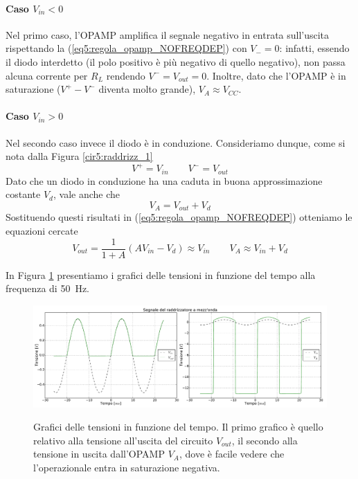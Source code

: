 \paragraph*{Caso $V_{in}<0$}

Nel primo caso, l'OPAMP amplifica il segnale negativo in entrata sull'uscita rispettando la (\ref{eq5:regola_opamp_NOFREQDEP}) con $V_-=0$: infatti, essendo il diodo interdetto (il polo positivo è più negativo di quello negativo), non passa alcuna corrente per $R_L$ rendendo $V^-=V_{out}=0$. Inoltre, dato che l'OPAMP è in saturazione ($V^+-V^-$ diventa molto grande), $V_A \approx V_{CC}$.

\paragraph*{Caso $V_{in}>0$}

Nel secondo caso invece il diodo è in conduzione. Consideriamo dunque, come si nota dalla Figura \ref{cir5:raddrizz_1}
$$V^+=V_{in} \qquad V^-=V_{out}$$
Dato che un diodo in conduzione ha una caduta in buona approssimazione costante $V_d$, vale anche che
$$V_{A}=V_{out}+V_d$$
Sostituendo questi risultati in (\ref{eq5:regola_opamp_NOFREQDEP}) otteniamo le equazioni cercate
\begin{equation}
V_{out}=\frac{1}{1+A} (A V_{in} - V_d) \approx V_{in} \qquad V_{A} \approx V_{in}+V_d
\label{eq5:leggi_1.1}
\end{equation}

In Figura \ref{gr5:primo_raddrizzatore} presentiamo i grafici delle tensioni in funzione del tempo alla frequenza di \SI{50}{\Hz}.

\begin{figure}[H]
 \centering
   {\includegraphics[width=\textwidth]{../E05/latex/unite_tempo.pdf}}
 \caption{Grafici delle tensioni in funzione del tempo. Il primo grafico è quello relativo alla tensione all'uscita del circuito $V_{out}$, il secondo alla tensione in uscita dall'OPAMP $V_A$, dove è facile vedere che l'operazionale entra in saturazione negativa.}
 \label{gr5:primo_raddrizzatore}
\end{figure}

